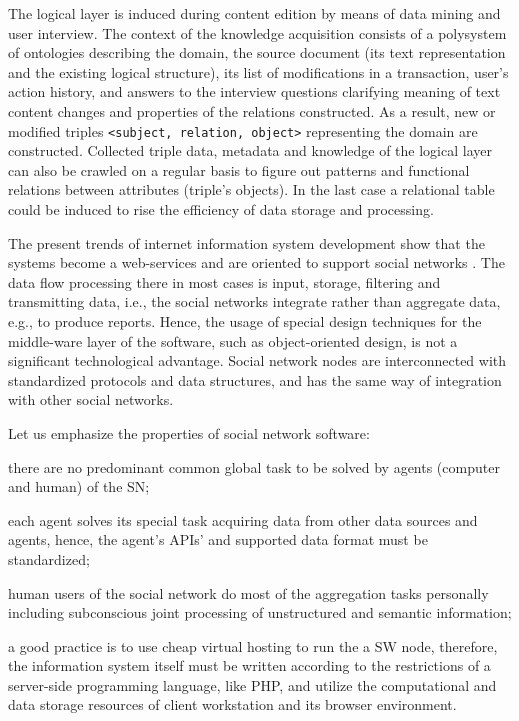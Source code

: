 \documentclass[conference]{IEEEtran}
\begin{document}
The logical layer is induced during content edition by means of data
mining and user interview.  The context of the knowledge acquisition
consists of a polysystem \cite{father} of ontologies describing the
domain, the source document (its text representation and the existing
logical structure), its list of modifications in a transaction, user's
action history, and answers to the interview questions clarifying
meaning of text content changes and properties of the relations
constructed.  As a result, new or modified triples \texttt{<subject,
  relation, object>} representing the domain are constructed.
Collected triple data, metadata and knowledge of the logical layer can
also be crawled on a regular basis to figure out patterns and
functional relations between attributes (triple's objects).  In the
last case a relational table could be induced to rise the efficiency
of data storage and processing.

The present trends of internet information system development show
that the systems become a web-services and are oriented to support
social networks \cite{SN}.  The data flow processing there in most
cases is input, storage, filtering and transmitting data, i.e., the
social networks integrate rather than aggregate data, e.g., to produce
reports.  Hence, the usage of special design techniques for the
middle-ware layer of the software, such as object-oriented design, is
not a significant technological advantage.  Social network nodes are
interconnected with standardized protocols and data structures, and
has the same way of integration with other social networks.

Let us emphasize the properties of social network software:
\begin{IEEEitemize}[\IEEEsetlabelwidth{Z}]
\item there are no predominant common global task to be solved by
  agents (computer and human) of the SN;
\item each agent solves its special task acquiring data from other
  data sources and agents, hence, the agent's APIs’ and
  supported data format must be standardized;
\item human users of the social network do most of the aggregation
  tasks personally including subconscious joint processing of
  unstructured and semantic information;
\item a good practice is to use cheap virtual hosting to run the
  a SW node, therefore, the information system itself must be written
  according to the restrictions of a server-side programming language,
  like PHP, and utilize the computational and data storage resources
  of client workstation and its browser environment.
\end{IEEEitemize}
\end{document}
